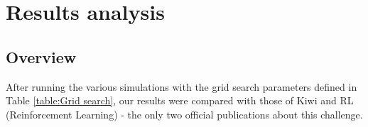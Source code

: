 \begin{table}[!ht]
    \centering
    \caption{Grid search}
    \label{table:Grid search}
\end{table}

\section{Results analysis}
\subsection{Overview}

After running the various simulations with the grid search parameters defined in Table \ref{table:Grid search}, our results were compared with those of Kiwi and RL (Reinforcement Learning) \cite{reinforcement_learning_yaro} - the only two official publications about this challenge.

